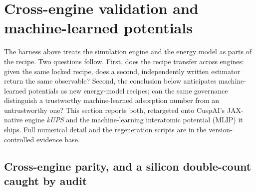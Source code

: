\section{Cross-engine validation and machine-learned potentials}\label{sec:v06}

The harness above treats the simulation engine and the energy model as parts of the recipe. Two
questions follow. First, does the recipe transfer across engines: given the same locked recipe, does a
second, independently written estimator return the same observable? Second, the conclusion below
anticipates machine-learned potentials as new energy-model recipes; can the same governance distinguish
a trustworthy machine-learned adsorption number from an untrustworthy one? This section reports both,
retargeted onto CuspAI's JAX-native engine \emph{kUPS} and the machine-learning interatomic potential
(MLIP) it ships. Full numerical detail and the regeneration scripts are in the version-controlled evidence base.

\subsection{Cross-engine parity, and a silicon double-count caught by audit}\label{sec:v06-parity}

